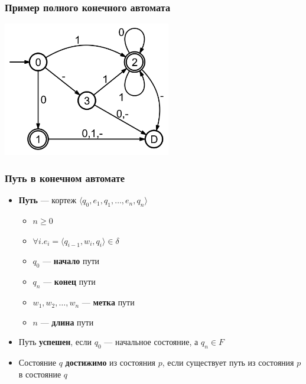 \documentclass{beamer}
\begin{document}
\begin{frame}[fragile]
  \transwipe[direction=90]
  \frametitle{Пример полного конечного автомата}
  \begin{center}
     \includegraphics[width=0.55\textwidth]{pics/FA_DN.PNG}  
   \end{center}
\end{frame}

\begin{frame}[fragile]
  \transwipe[direction=90]
  \frametitle{Путь в конечном автомате}
  \begin{itemize}
    \item \textbf{Путь} --- кортеж $\langle q_0, e_1, q_1, \dots, e_n, q_n\rangle$
    \begin{itemize}
      \item $n \geq 0$
      \item $\forall i. e_i = \langle q_{i-1}, w_i, q_i\rangle \in \delta$
      \item $q_0$ --- \textbf{начало} пути
      \item $q_n$ --- \textbf{конец} пути
      \item $w_1, w_2, \dots, w_n$ --- \textbf{метка} пути
      \item $n$ --- \textbf{длина} пути
    \end{itemize}
    \item Путь \textbf{успешен}, если $q_0$ --- начальное состояние, а $q_n \in F$
    \item Состояние $q$ \textbf{достижимо} из состояния $p$, если существует путь из состояния $p$ в состояние $q$
  \end{itemize}
\end{frame}
\end{document}
